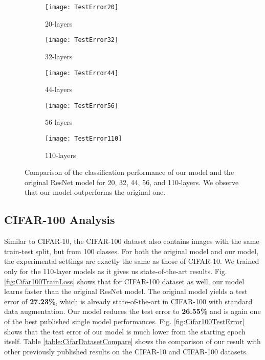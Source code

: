 \documentclass[10pt,twocolumn,letterpaper]{article}
\begin{document}
\begin{figure*}
    \centering
    \begin{subfigure}{.33\linewidth}
        \centering
        \texttt{[image: TestError20]}
        \caption{20-layers}
        \label{fig:Cifar10TestError20}
    \end{subfigure}
    \begin{subfigure}{.33\linewidth}
        \centering
        \texttt{[image: TestError32]}
        \caption{32-layers}
        \label{fig:Cifar10TestError32}
    \end{subfigure}
    \begin{subfigure}{.33\linewidth}
        \centering
        \texttt{[image: TestError44]}
        \caption{44-layers}
        \label{fig:Cifar10TestError44}
    \end{subfigure}
    \begin{subfigure}{.4\textwidth}
        \centering
        \texttt{[image: TestError56]}
        \caption{56-layers}
        \label{fig:Cifar10TestError56}
    \end{subfigure}
    \begin{subfigure}{.4\textwidth}
        \centering
        \texttt{[image: TestError110]}
        \caption{110-layers}
        \label{fig:Cifar10TestError110}
    \end{subfigure}
    \caption{Comparison of the classification performance of our model and the original ResNet model for 20, 32, 44, 56, and 110-layers. We observe that our model outperforms the original one.}
    \label{fig:Cifar10TestError}
\end{figure*}


\subsection{CIFAR-100 Analysis}

Similar to CIFAR-10, the CIFAR-100 dataset \cite{[10]} also contains  images with the same train-test split, but from 100 classes. For both the original model and our model, the experimental settings are exactly the same as those of CIFAR-10. We trained only for the 110-layer models as it gives us state-of-the-art results. Fig. \ref{fig:Cifar100TrainLoss} shows that for CIFAR-100 dataset as well, our model learns faster than the original ResNet model. The original model yields a test error of \textbf{27.23\%}, which is already state-of-the-art in CIFAR-100 with standard data augmentation. Our model reduces the test error to \textbf{26.55\%} and is again one of the best published single model performances. Fig. \ref{fig:Cifar100TestError} shows that the test error of our model is much lower from the starting epoch itself. Table \ref{table:CifarDatasetCompare} shows the comparison of our result with other previously published results on the CIFAR-10 and CIFAR-100 datasets.
\end{document}
